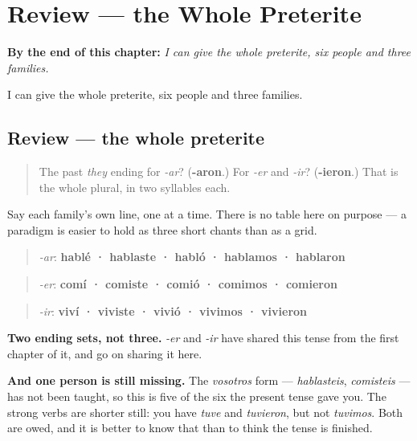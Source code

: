 
\chapter{Review --- the Whole Preterite}
\label{ch:repaso-preterito}

\begin{chapteropening}
\textbf{By the end of this chapter:} \emph{I can give the whole preterite, six people and three families.}

I can give the whole preterite, six people and three families.
\end{chapteropening}

\section[the whole preterite]{Review — the whole preterite}

\label{lesson:ES-C55-repaso-preterito}



\begin{quote}
The past \emph{they} ending for \emph{-ar}? (\textbf{-aron}.) For \emph{-er} and \emph{-ir}? (\textbf{-ieron}.) That is the whole plural, in two syllables each.
\end{quote}

\begin{grammarlens}[title={What you've built}]
Say each family's own line, one at a time. There is no table here on purpose — a paradigm is easier to hold as three short chants than as a grid.

\begin{quote}
\emph{-ar}: \textbf{hablé · hablaste · habló · hablamos · hablaron}
\end{quote}

\begin{quote}
\emph{-er}: \textbf{comí · comiste · comió · comimos · comieron}
\end{quote}

\begin{quote}
\emph{-ir}: \textbf{viví · viviste · vivió · vivimos · vivieron}
\end{quote}

\textbf{Two ending sets, not three.} \emph{-er} and \emph{-ir} have shared this tense from the first chapter of it, and go on sharing it here.

\textbf{And one person is still missing.} The \emph{vosotros} form — \emph{hablasteis}, \emph{comisteis} — has not been taught, so this is five of the six the present tense gave you. The strong verbs are shorter still: you have \emph{tuve} and \emph{tuvieron}, but not \emph{tuvimos}. Both are owed, and it is better to know that than to think the tense is finished.
\end{grammarlens}

